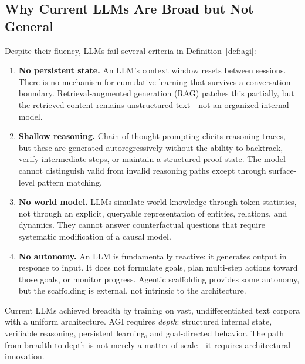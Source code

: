 \subsection{Why Current LLMs Are Broad but Not General}
\label{sec:llm-limitations-agi}

Despite their fluency, LLMs fail several criteria in Definition~\ref{def:agi}:

\begin{enumerate}[leftmargin=1.8em]
  \item \textbf{No persistent state.} An LLM's context window resets between sessions. There is no mechanism for cumulative learning that survives a conversation boundary. Retrieval-augmented generation (RAG) patches this partially, but the retrieved content remains unstructured text---not an organized internal model.

  \item \textbf{Shallow reasoning.} Chain-of-thought prompting \citep{wei2022chain} elicits reasoning traces, but these are generated autoregressively without the ability to backtrack, verify intermediate steps, or maintain a structured proof state. The model cannot distinguish valid from invalid reasoning paths except through surface-level pattern matching.

  \item \textbf{No world model.} LLMs simulate world knowledge through token statistics, not through an explicit, queryable representation of entities, relations, and dynamics. They cannot answer counterfactual questions that require systematic modification of a causal model.

  \item \textbf{No autonomy.} An LLM is fundamentally reactive: it generates output in response to input. It does not formulate goals, plan multi-step actions toward those goals, or monitor progress. Agentic scaffolding \citep{yao2023react} provides some autonomy, but the scaffolding is external, not intrinsic to the architecture.
\end{enumerate}

\begin{keyinsight}
Current LLMs achieved breadth by training on vast, undifferentiated text corpora with a uniform architecture. AGI requires \emph{depth}: structured internal state, verifiable reasoning, persistent learning, and goal-directed behavior. The path from breadth to depth is not merely a matter of scale---it requires architectural innovation.
\end{keyinsight}

